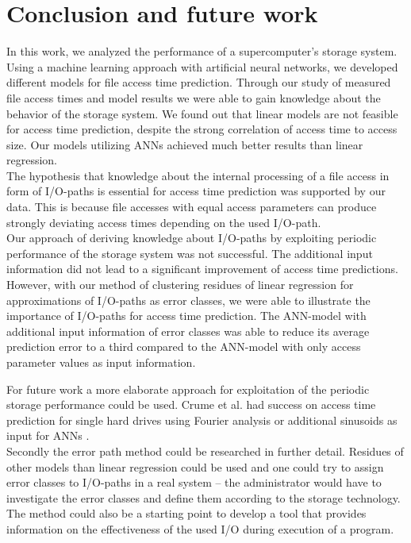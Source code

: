 \documentclass{superfri}
\begin{document}
\section{Conclusion and future work}
In this work, we analyzed the performance of a supercomputer's storage system.
Using a machine learning approach with artificial neural networks, we developed different models for file access time prediction.
Through our study of measured file access times and model results we were able to gain knowledge about the behavior of the storage system.
We found out that linear models are not feasible for access time prediction, despite the strong correlation of access time to access size.
Our models utilizing ANNs achieved much better results than linear regression.\\
The hypothesis that knowledge about the internal processing of a file access in form of I/O-paths is essential for access time prediction was supported by our data.
This is because file accesses with equal access parameters can produce strongly deviating access times depending on the used I/O-path.\\
Our approach of deriving knowledge about I/O-paths by exploiting periodic performance of the storage system was not successful.
The additional input information did not lead to a significant improvement of access time predictions.\\
However, with our method of clustering residues of linear regression for approximations of I/O-paths as error classes, we were able to illustrate the importance of I/O-paths for access time prediction. The ANN-model with additional input information of error classes was able to reduce its average prediction error to a third compared to the ANN-model with only access parameter values as input information.\medskip

For future work a more elaborate approach for exploitation of the periodic storage performance could be used. 
Crume et al. had success on access time prediction for single hard drives using Fourier analysis \cite{Crume:2013:FML:2538542.2538561} or additional sinusoids as input for ANNs \cite{crumelatent}.\\
Secondly the error path method could be researched in further detail.
Residues of other models than linear regression could be used and one could try to assign error classes to I/O-paths in a real system -- the administrator would have to investigate the error classes and define them according to the storage technology.
The method could also be a starting point to develop a tool that provides information on the effectiveness of the used I/O during execution of a program.

\openaccess



\end{document}

